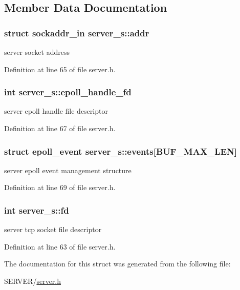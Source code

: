 \subsection{Member Data Documentation}
\hypertarget{structserver__s_a09fe17ff633d4d26a4080d46749c1fe3}{
\subsubsection[{addr}]{\setlength{\rightskip}{0pt plus 5cm}struct sockaddr\-\_\-in server\-\_\-s\-::addr}}\label{structserver__s_a09fe17ff633d4d26a4080d46749c1fe3}


server socket address 



Definition at line 65 of file server.\-h.

\hypertarget{structserver__s_a86019c8230bc00f711bb8276a07442f0}{
\subsubsection[{epoll\-\_\-handle\-\_\-fd}]{\setlength{\rightskip}{0pt plus 5cm}int server\-\_\-s\-::epoll\-\_\-handle\-\_\-fd}}\label{structserver__s_a86019c8230bc00f711bb8276a07442f0}


server epoll handle file descriptor 



Definition at line 67 of file server.\-h.

\hypertarget{structserver__s_a9095f17d03e5eb5c4e99092cbec45eed}{
\subsubsection[{events}]{\setlength{\rightskip}{0pt plus 5cm}struct epoll\-\_\-event server\-\_\-s\-::events\mbox{[}{\bf B\-U\-F\-\_\-\-M\-A\-X\-\_\-\-L\-E\-N}\mbox{]}}}\label{structserver__s_a9095f17d03e5eb5c4e99092cbec45eed}


server epoll event management structure 



Definition at line 69 of file server.\-h.

\hypertarget{structserver__s_a6129acbc6b313f77efeb488754f559ec}{
\subsubsection[{fd}]{\setlength{\rightskip}{0pt plus 5cm}int server\-\_\-s\-::fd}}\label{structserver__s_a6129acbc6b313f77efeb488754f559ec}


server tcp socket file descriptor 



Definition at line 63 of file server.\-h.



The documentation for this struct was generated from the following file\-:\begin{DoxyCompactItemize}
\item 
S\-E\-R\-V\-E\-R/\hyperlink{server_8h}{server.\-h}\end{DoxyCompactItemize}
